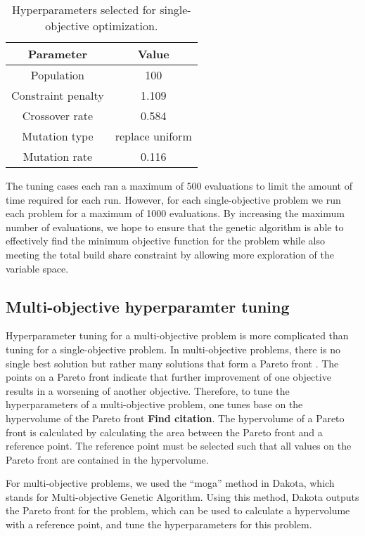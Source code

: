 \begin{table}
    \centering
    \caption{Hyperparameters selected for single-objective optimization.}
    \label{tab:soga_parameters}
    \begin{tabular}{c c}
        \hline
        Parameter & Value \\
        \hline
        Population & 100 \\
        Constraint penalty & 1.109\\
        Crossover rate & 0.584\\
        Mutation type & replace uniform\\
        Mutation rate & 0.116\\
        \hline
    \end{tabular}
\end{table}

The tuning cases each ran a maximum of 500 evaluations to limit the 
amount of time required for each run. However, for each single-objective 
problem we run each problem for a maximum of 1000 evaluations. By 
increasing the maximum number of evaluations, we hope to ensure that 
the genetic algorithm is able to effectively find the minimum objective 
function for the problem while also meeting the total build share 
constraint by allowing more exploration of the variable space. 

\subsection{Multi-objective hyperparamter tuning}
Hyperparameter tuning for a multi-objective problem is more complicated 
than tuning for a single-objective problem. In multi-objective 
problems, there is no single best solution but rather many solutions 
that form a Pareto front \cite{adams_dakota_2021}. The points on a 
Pareto front indicate that further improvement of one objective 
results in a worsening of another objective. Therefore, to tune the 
hyperparameters of a multi-objective problem, one tunes base on the 
hypervolume of the Pareto front \textbf{Find citation}. The 
hypervolume of a Pareto front is calculated by calculating the area 
between the Pareto front and a reference point. The reference point 
must be selected such that all values on the Pareto front are contained in 
the hypervolume. 

For multi-objective problems, we used the ``moga'' method in Dakota, which 
stands for Multi-objective Genetic Algorithm. Using this method, Dakota
outputs the Pareto front for the problem, which can be used to calculate 
a hypervolume with a reference point, and 
tune the hyperparameters for this problem. 

